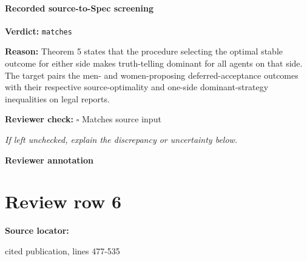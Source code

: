 \documentclass[10pt]{article}
\newcommand{\reviewerbox}{%
  \par\noindent\fbox{\parbox{0.96\linewidth}{\rule{0pt}{0.38in}}}\par
}
\newcommand{\reviewmatch}[1]{%
  \par\noindent\textbf{Reviewer check:} $\square$\; #1\par
  \noindent\emph{If left unchecked, explain the discrepancy or uncertainty below.}\par
}
\begin{document}
\paragraph{Recorded source-to-Spec screening}
\textbf{Verdict:} \texttt{matches}
\\
{\raggedright
\textbf{Reason:} Theorem 5 states that the procedure selecting the optimal stable outcome for either side makes truth-\allowbreak{}telling dominant for all agents on that side.\allowbreak{}  The target pairs the men-\allowbreak{} and women-\allowbreak{}proposing deferred-\allowbreak{}acceptance outcomes with their respective source-\allowbreak{}optimality and one-\allowbreak{}side dominant-\allowbreak{}strategy inequalities on legal reports.\allowbreak{}
\par}
\reviewmatch{Matches source input}
\noindent\textbf{Reviewer annotation}\par
\reviewerbox
\clearpage
\hypertarget{source-claim-b35add4c342a0889}{}
\section*{Review row 6}
\textbf{Source locator:} {\footnotesize\raggedright cited publication, lines 477-\allowbreak{}535\par}
\end{document}
